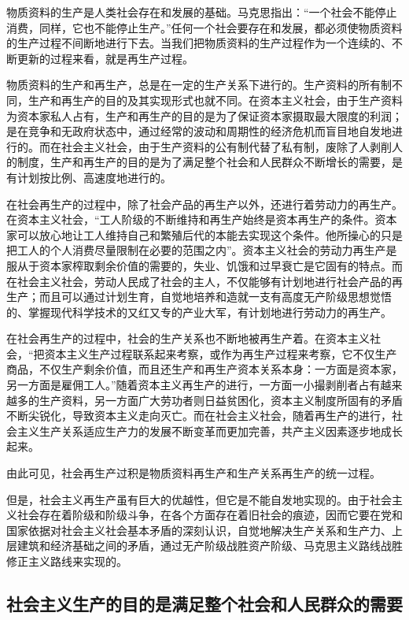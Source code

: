 \documentclass{book}
\begin{document}
物质资料的生产是人类社会存在和发展的基础。马克思指出：“一个社会不能停止消费，同样，它也不能停止生产。”任何一个社会要存在和发展，都必须使物质资料的生产过程不间断地进行下去。当我们把物质资料的生产过程作为一个连续的、不断更新的过程来看，就是再生产过程。

物质资料的生产和再生产，总是在一定的生产关系下进行的。生产资料的所有制不同，生产和再生产的目的及其实现形式也就不同。在资本主义社会，由于生产资料为资本家私人占有，生产和再生产的目的是为了保证资本家摄取最大限度的利润；是在竞争和无政府状态中，通过经常的波动和周期性的经济危机而盲目地自发地进行的。而在社会主义社会，由于生产资料的公有制代替了私有制，废除了人剥削人的制度，生产和再生产的目的是为了满足整个社会和人民群众不断增长的需要，是有计划按比例、高速度地进行的。

在社会再生产的过程中，除了社会产品的再生产以外，还进行着劳动力的再生产。在资本主义社会，“工人阶级的不断维持和再生产始终是资本再生产的条件。资本家可以放心地让工人维持自己和繁殖后代的本能去实现这个条件。他所操心的只是把工人的个人消费尽量限制在必要的范围之内”。资本主义社会的劳动力再生产是服从于资本家榨取剩余价值的需要的，失业、饥饿和过早衰亡是它固有的特点。而在社会主义社会，劳动人民成了社会的主人，不仅能够有计划地进行社会产品的再生产；而且可以通过计划生育，自觉地培养和造就一支有高度无产阶级思想觉悟的、掌握现代科学技术的又红又专的产业大军，有计划地进行劳动力的再生产。

在社会再生产的过程中，社会的生产关系也不断地被再生产着。在资本主义社会，“把资本主义生产过程联系起来考察，或作为再生产过程来考察，它不仅生产商品，不仅生产剩余价值，而且还生产和再生产资本关系本身：一方面是资本家，另一方面是雇佣工人。”随着资本主义再生产的进行，一方面一小撮剥削者占有越来越多的生产资料，另一方面广大劳功者则日益贫困化，资本主义制度所固有的矛盾不断尖锐化，导致资本主义走向灭亡。而在社会主义社会，随着再生产的进行，社会主义生产关系适应生产力的发展不断变革而更加完善，共产主义因素逐步地成长起来。

由此可见，社会再生产过积是物质资料再生产和生产关系再生产的统一过程。

但是，社会主义再生产虽有巨大的优越性，但它是不能自发地实现的。由于社会主义社会存在着阶级和阶级斗争，在各个方面存在着旧社会的痕迹，因而它要在党和国家依据对社会主义社会基本矛盾的深刻认识，自觉地解决生产关系和生产力、上层建筑和经济基础之间的矛盾，通过无产阶级战胜资产阶级、马克思主义路线战胜修正主义路线来实现的。

\subsection{社会主义生产的目的是满足整个社会和人民群众的需要}
\end{document}
